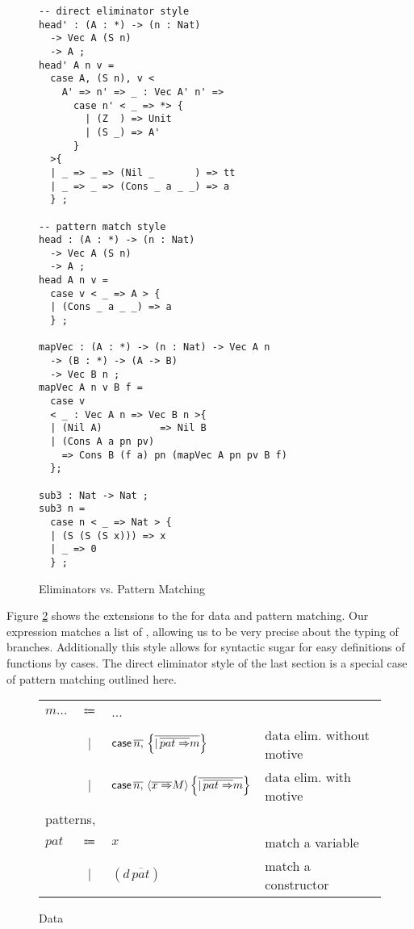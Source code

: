 \begin{figure}
\begin{lstlisting}[basicstyle={\ttfamily\small}]
-- direct eliminator style
head' : (A : *) -> (n : Nat)
  -> Vec A (S n) 
  -> A ;
head' A n v =
  case A, (S n), v <
    A' => n' => _ : Vec A' n' =>
      case n' < _ => *> {
        | (Z  ) => Unit
        | (S _) => A'
      }
  >{
  | _ => _ => (Nil _       ) => tt
  | _ => _ => (Cons _ a _ _) => a
  } ;

-- pattern match style
head : (A : *) -> (n : Nat)
  -> Vec A (S n) 
  -> A ;
head A n v =
  case v < _ => A > {
  | (Cons _ a _ _) => a
  } ;

mapVec : (A : *) -> (n : Nat) -> Vec A n 
  -> (B : *) -> (A -> B)
  -> Vec B n ;
mapVec A n v B f =
  case v 
  < _ : Vec A n => Vec B n >{
  | (Nil A)          => Nil B
  | (Cons A a pn pv) 
    => Cons B (f a) pn (mapVec A pn pv B f)
  };

sub3 : Nat -> Nat ;
sub3 n =
  case n < _ => Nat > {
  | (S (S (S x))) => x
  | _ => 0
  } ;
\end{lstlisting}



\caption{Eliminators vs. Pattern Matching}
\label{fig:data-eliminators}
\end{figure}

Figure \ref{fig:surface-data} shows the extensions to the \slang{} for data and pattern matching.
Our \case{} expression matches a list of \scruts{}, allowing us to be very precise about the typing of branches.
Additionally this style allows for syntactic sugar for easy definitions of functions by cases.
The direct eliminator style \case{} of the last section is a special case of pattern matching outlined here.

\begin{figure}
\begin{tabular}{lcll}
$m...$ & $\Coloneqq$ & ... & \tabularnewline
 & $|$ & $\mathsf{case}{} \,\overline{n,}\,\left\{ \overline{|\,\overline{pat\Rightarrow}m}\right\} $ & data elim. without motive\tabularnewline
 & $|$ & $\mathsf{case}{} \,\overline{n,}\,\left\langle \overline{x\Rightarrow}M\right\rangle \left\{ \overline{|\,\overline{pat\Rightarrow}m}\right\} $ & data elim. with motive\tabularnewline
\multicolumn{4}{l}{patterns,}\tabularnewline
$pat$ & $\Coloneqq$ & $x$ & match a variable\tabularnewline
 & $|$ & $(d\,\overline{pat})$ & match a constructor\tabularnewline
\end{tabular}

\caption{\SLang{} Data}
\label{fig:surface-data}
\end{figure}

